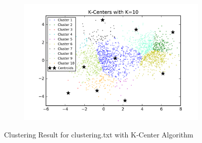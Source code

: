 \begin{figure}[htb]
\begin{subfigure}[b]{0.475\textwidth}
            \includegraphics[width=\textwidth]{./figures/clustering_kCenter_10.png}
        \end{subfigure}
        
        \caption{Clustering Result for clustering.txt with K-Center Algorithm}
        \label{fig:kmean_clustering}
\end{figure}

